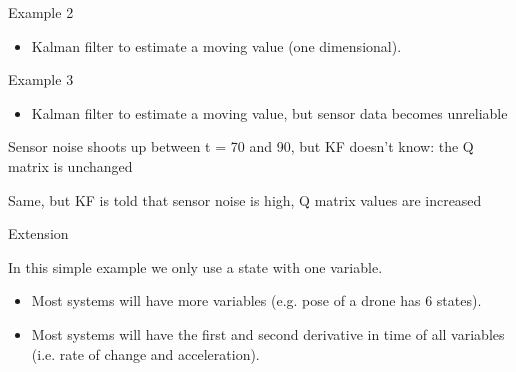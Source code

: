 \documentclass[compress]{beamer}
\providecommand{\tightlist}{%
  \setlength{\itemsep}{0pt}\setlength{\parskip}{0pt}}
\begin{document}
\begin{frame}{}

\end{frame}

\begin{frame}{Example 2}

\begin{itemize}
\tightlist
\item
  Kalman filter to estimate a moving value (one dimensional).
\end{itemize}

\end{frame}

\begin{frame}{Example 3}

\begin{itemize}
\tightlist
\item
  Kalman filter to estimate a moving value, but sensor data becomes
  unreliable
\end{itemize}

Sensor noise shoots up between t = 70 and 90, but KF doesn't know: the Q
matrix is unchanged

Same, but KF is told that sensor noise is high, Q matrix values are
increased

\end{frame}

\begin{frame}{Extension}

In this simple example we only use a state with one variable.

\begin{itemize}
\tightlist
\item
  Most systems will have more variables (e.g. pose of a drone has 6
  states).
\item
  Most systems will have the first and second derivative in time of all
  variables (i.e. rate of change and acceleration).
\end{itemize}

\end{frame}
\end{document}
